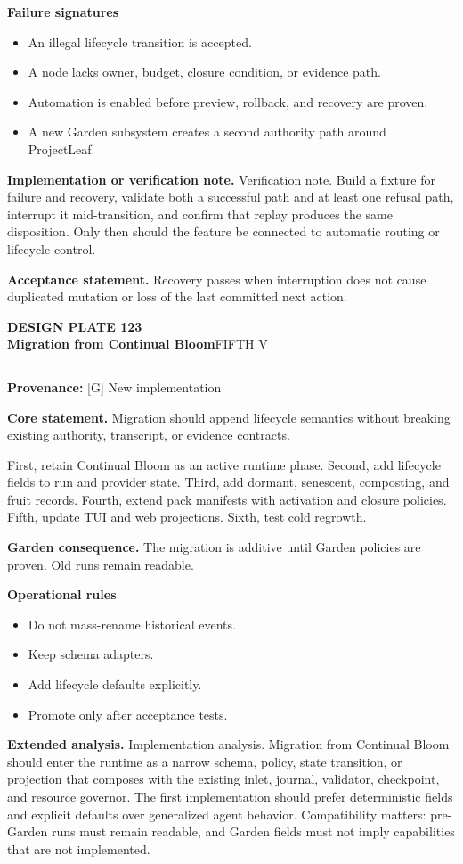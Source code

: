 \documentclass[10pt,letterpaper,oneside]{article}
\newcommand{\prov}[1]{\textcolor{gardenBlue}{\sffamily\footnotesize\textbf{Provenance:} #1}}
\newcommand{\platetitle}[3]{%
  \begin{minipage}[t][0.54in][t]{\textwidth}
  {\sffamily\bfseries\color{gardenDeep}\fontsize{9}{10}\selectfont DESIGN PLATE #1}\\[-1pt]
  {\sffamily\bfseries\color{gardenInk}\fontsize{16.5}{18}\selectfont #2}\hfill{\sffamily\color{gardenGreen}\large #3}
  \end{minipage}\vspace{-2pt}\hrule\vspace{5pt}}
\begin{document}
\textbf{Failure signatures}
\begin{itemize}
\item An illegal lifecycle transition is accepted.
\item A node lacks owner, budget, closure condition, or evidence path.
\item Automation is enabled before preview, rollback, and recovery are proven.
\item A new Garden subsystem creates a second authority path around ProjectLeaf.
\end{itemize}
\textbf{Implementation or verification note.} Verification note. Build a fixture for failure and recovery, validate both a successful path and at least one refusal path, interrupt it mid-transition, and confirm that replay produces the same disposition. Only then should the feature be connected to automatic routing or lifecycle control.

\begin{acceptbox}
\textbf{Acceptance statement.} Recovery passes when interruption does not cause duplicated mutation or loss of the last committed next action.
\end{acceptbox}
\newpage
\platetitle{123}{Migration from Continual Bloom}{FIFTH V}
\prov{[G] New implementation}
\fontsize{8.85}{10.45}\selectfont
\begin{corebox}
\textbf{Core statement.} Migration should append lifecycle semantics without breaking existing authority, transcript, or evidence contracts.
\end{corebox}
First, retain Continual Bloom as an active runtime phase. Second, add lifecycle fields to run and provider state. Third, add dormant, senescent, composting, and fruit records. Fourth, extend pack manifests with activation and closure policies. Fifth, update TUI and web projections. Sixth, test cold regrowth.

\textbf{Garden consequence.} The migration is additive until Garden policies are proven. Old runs remain readable.

\textbf{Operational rules}
\begin{itemize}
\item Do not mass-rename historical events.
\item Keep schema adapters.
\item Add lifecycle defaults explicitly.
\item Promote only after acceptance tests.
\end{itemize}
\textbf{Extended analysis.} Implementation analysis. Migration from Continual Bloom should enter the runtime as a narrow schema, policy, state transition, or projection that composes with the existing inlet, journal, validator, checkpoint, and resource governor. The first implementation should prefer deterministic fields and explicit defaults over generalized agent behavior. Compatibility matters: pre-Garden runs must remain readable, and Garden fields must not imply capabilities that are not implemented.
\end{document}
